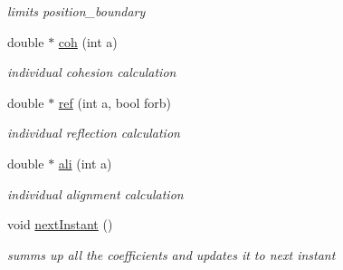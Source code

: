 \begin{DoxyCompactItemize}
\begin{DoxyCompactList}\small\item\em limits position\+\_\+boundary \end{DoxyCompactList}\item 
\mbox{\label{classflock_aef52ecb6e11d4953dbf2daec8fd3eab5}} 
double $\ast$ \mbox{\hyperlink{classflock_aef52ecb6e11d4953dbf2daec8fd3eab5}{coh}} (int a)
\begin{DoxyCompactList}\small\item\em individual cohesion calculation \end{DoxyCompactList}\item 
\mbox{\label{classflock_aa33220920f97d32bcbc38d01431ba8f4}} 
double $\ast$ \mbox{\hyperlink{classflock_aa33220920f97d32bcbc38d01431ba8f4}{ref}} (int a, bool forb)
\begin{DoxyCompactList}\small\item\em individual reflection calculation \end{DoxyCompactList}\item 
\mbox{\label{classflock_a55b3bf7d63bd5d6d6ae629bd38cf7a8e}} 
double $\ast$ \mbox{\hyperlink{classflock_a55b3bf7d63bd5d6d6ae629bd38cf7a8e}{ali}} (int a)
\begin{DoxyCompactList}\small\item\em individual alignment calculation \end{DoxyCompactList}\item 
\mbox{\label{classflock_aeaf1b4e69875113e0d3bedc4296fa871}} 
void \mbox{\hyperlink{classflock_aeaf1b4e69875113e0d3bedc4296fa871}{next\+Instant}} ()
\begin{DoxyCompactList}\small\item\em summs up all the coefficients and updates it to next instant \end{DoxyCompactList}\end{DoxyCompactItemize}
